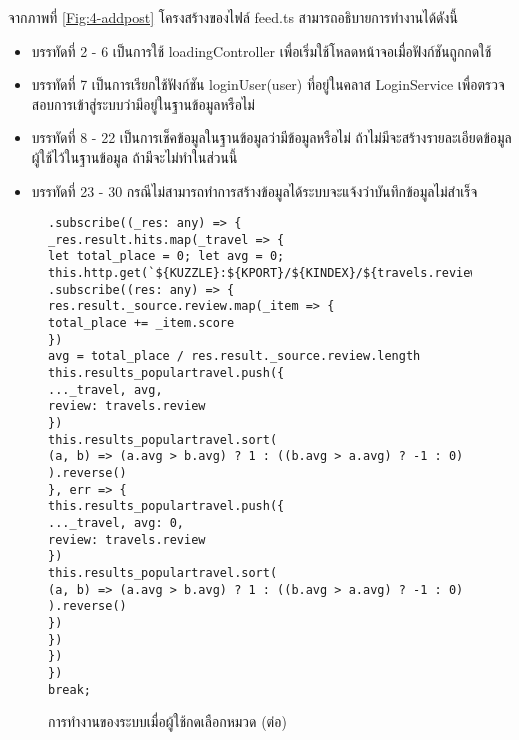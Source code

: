 จากภาพที่ \ref{Fig:4-addpost} โครงสร้างของไฟล์ feed.ts สามารถอธิบายการทำงานได้ดังนี้
\begin{itemize}[label={--}]
\item บรรทัดที่ 2 - 6 เป็นการใช้ loadingController เพื่อเริ่มใช้โหลดหน้าจอเมื่อฟังก์ชันถูกกดใช้
\item บรรทัดที่ 7 เป็นการเรียกใช้ฟังก์ชัน loginUser(user) ที่อยู่ในคลาส LoginService เพื่อตรวจสอบการเข้าสู่ระบบว่ามีอยู่ในฐานข้อมูลหรือไม่
\item บรรทัดที่ 8 - 22 เป็นการเช็คข้อมูลในฐานข้อมูลว่ามีข้อมูลหรือไม่ ถ้าไม่มีจะสร้างรายละเอียดข้อมูลผู้ใช้ไว้ในฐานข้อมูล ถ้ามีจะไม่ทำในส่วนนี้
\item บรรทัดที่ 23 - 30 กรณีไม่สามารถทำการสร้างข้อมูลได้ระบบจะแจ้งว่าบันทึกข้อมูลไม่สำเร็จ 
\end{itemize}
\newpage


















\begin{figure}[H]
{\begin{lstlisting}
.subscribe((_res: any) => {
_res.result.hits.map(_travel => {
let total_place = 0; let avg = 0;
this.http.get(`${KUZZLE}:${KPORT}/${KINDEX}/${travels.review}/${_travel._id}`)
.subscribe((res: any) => {
res.result._source.review.map(_item => {
total_place += _item.score
})
avg = total_place / res.result._source.review.length
this.results_populartravel.push({
..._travel, avg,
review: travels.review
})
this.results_populartravel.sort(
(a, b) => (a.avg > b.avg) ? 1 : ((b.avg > a.avg) ? -1 : 0)
).reverse()
}, err => {
this.results_populartravel.push({
..._travel, avg: 0,
review: travels.review
})
this.results_populartravel.sort(
(a, b) => (a.avg > b.avg) ? 1 : ((b.avg > a.avg) ? -1 : 0)
).reverse()
})
})
})
})
break;
\end{lstlisting}}
\caption{การทำงานของระบบเมื่อผู้ใช้กดเลือกหมวด (ต่อ)}
\label{Fig:4-pupular1}
\end{figure}
\newpage

